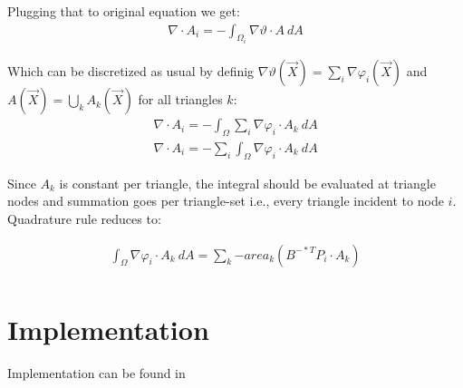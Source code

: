 \documentclass{birkjour}
\numberwithin{equation}{section}
\begin{document}
Plugging that to original equation we get:
\begin{eqnarray}
	\nabla \cdot A_i = - \int_{\Omega_i} { \nabla \vartheta \cdot A \ dA } \nonumber
\end{eqnarray}

Which can be discretized as usual by definig $\nabla \vartheta(\vec X) = \sum_i { \nabla \varphi_i(\vec X) }$ and
$A(\vec X) = \bigcup_k { A_k(\vec X) }$ for all triangles $k$:
\begin{eqnarray}
	\nabla \cdot A_i = - \int_{\Omega} { \sum_i { \nabla \varphi_i } \cdot A_k \ dA } \nonumber \\
	\nabla \cdot A_i = - \sum_i { \int_{\Omega} { \nabla \varphi_i \cdot A_k \ dA } } \nonumber
\end{eqnarray}

Since $A_k$ is constant per triangle, the integral should be evaluated at triangle nodes and summation 
goes per triangle-set i.e., every triangle incident to node $i$. Quadrature rule reduces to:

\begin{eqnarray}
	\int_{\Omega} { \nabla \varphi_i \cdot A_k \ dA } = \sum_k { - area_k (B^{-*T} P_i \cdot A_k)}  \nonumber\\
\end{eqnarray}

\section{Implementation}

Implementation can be found in \cite{Basic2DHeatEquationFEM}




\end{document}
